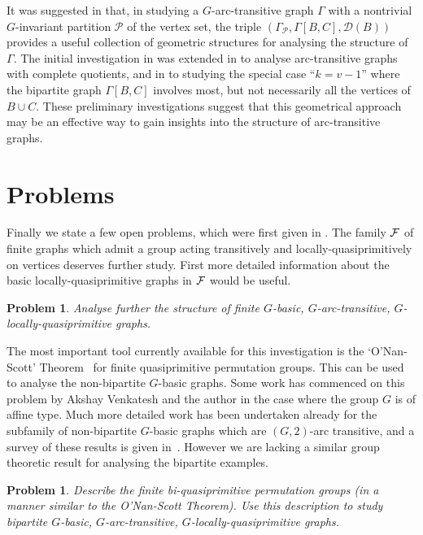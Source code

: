 \documentclass[12pt, a4paper]{article}
\newtheorem{problem}[theorem]{Problem}
\begin{document}
It was suggested in \cite{Gardiner-Praeger95} that, in studying
a $G$-arc-transitive graph $\Gamma$ with a  
nontrivial $G$-invariant partition $\mathcal{P}$ of the vertex set, 
the triple $(\Gamma_\mathcal{P}, \Gamma[B, C], \mathcal{D}(B))$
provides a useful collection of geometric structures for analysing
the structure of $\Gamma$. The initial  investigation in 
\cite{Gardiner-Praeger95} was extended  in \cite{Gardiner-Praeger98,
Gardiner-Praeger98a} to analyse arc-transitive graphs with complete 
quotients, and in \cite{lpz} to studying the special case ``$k=v-1$''
where the bipartite graph $\Gamma[B, C]$ involves most, but not 
necessarily all the vertices of $B\cup C$. These preliminary 
investigations suggest that this geometrical approach  may be
an effective way to gain insights into the structure of 
arc-transitive graphs.


\section{Problems}

Finally we state a few open problems,  which were first given 
in \cite{lpvz}. The family ${\cal F}$ of 
finite graphs which admit a group acting transitively and
locally-quasiprimitively on vertices deserves further study. 
First more detailed information
about the basic locally-quasiprimitive graphs in ${\cal F}$ would be
useful. 

\begin{problem}
\label{prob:structure}  
Analyse further the structure of finite $G$-basic, $G$-arc-transitive,
$G$-locally-quasiprimitive graphs.
\end{problem}  

The most 
important tool currently available for this investigation is the `O'Nan-Scott' 
Theorem~\cite{cep}
for finite quasiprimitive permutation groups.
This can be used to analyse the non-bipartite $G$-basic graphs.
Some work has commenced on this problem by  Akshay Venkatesh and the
author in the case where
the group $G$ is of affine type. Much more detailed work has
been undertaken already for the
subfamily of non-bipartite $G$-basic graphs  which are $(G,2)$-arc
transitive, and a survey 
of these results is given in~\cite{bcc}.
However we are lacking a similar group theoretic result for analysing the
bipartite examples.

\begin{problem}
\label{prob:bi-quasiprimitive}  
Describe the finite bi-quasiprimitive permutation groups (in a manner 
similar to the O'Nan-Scott Theorem). Use this description to study
bipartite $G$-basic, $G$-arc-transitive, $G$-locally-quasiprimitive graphs.
\end{problem}  
\end{document}
